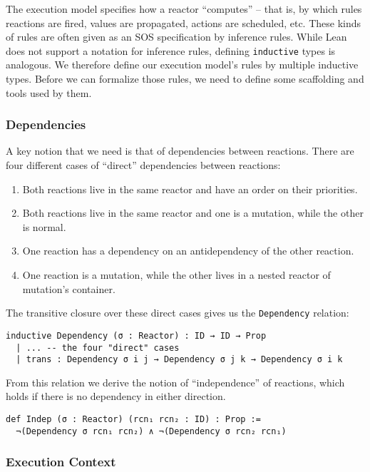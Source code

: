 The execution model specifies how a reactor ``computes'' -- that is, by which rules reactions are fired, values are propagated, actions are scheduled, etc. 
These kinds of rules are often given as an SOS specification by inference rules.
While Lean does not support a notation for inference rules, defining \lstinline{inductive} types is analogous.
We therefore define our execution model's rules by multiple inductive types.
Before we can formalize those rules, we need to define some scaffolding and tools used by them.

\subsubsection{Dependencies}

A key notion that we need is that of dependencies between reactions. 
There are four different cases of ``direct'' dependencies between reactions:

\begin{enumerate}
  \item Both reactions live in the same reactor and have an order on their priorities.
  \item Both reactions live in the same reactor and one is a mutation, while the other is normal.
  \item One reaction has a dependency on an antidependency of the other reaction.
  \item One reaction is a mutation, while the other lives in a nested reactor of mutation's container.
\end{enumerate}

The transitive closure over these direct cases gives us the \lstinline{Dependency} relation:

\begin{lstlisting}
inductive Dependency (σ : Reactor) : ID → ID → Prop
  | ... -- the four "direct" cases
  | trans : Dependency σ i j → Dependency σ j k → Dependency σ i k
\end{lstlisting}

From this relation we derive the notion of ``independence'' of reactions, which holds if there is no dependency in either direction.

\begin{lstlisting}
def Indep (σ : Reactor) (rcn₁ rcn₂ : ID) : Prop :=
  ¬(Dependency σ rcn₁ rcn₂) ∧ ¬(Dependency σ rcn₂ rcn₁)
\end{lstlisting}

\subsubsection{Execution Context}


